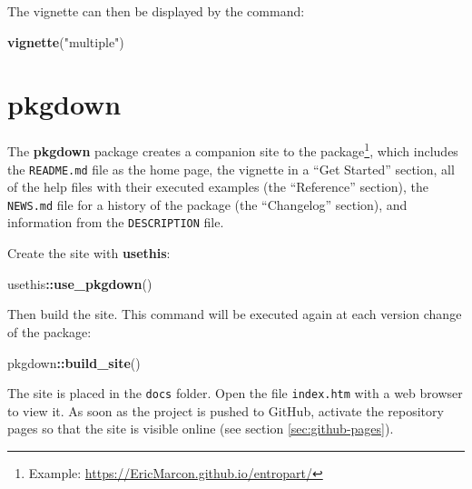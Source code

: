 \documentclass[
  12pt,
  american,
  a4paper,
  extrafontsizes,onecolumn,openright
  ]{memoir}
\newenvironment{Shaded}{\begin{snugshade}}{\end{snugshade}}
\newcommand{\FunctionTok}[1]{\textcolor[rgb]{0.13,0.29,0.53}{\textbf{#1}}}
\newcommand{\NormalTok}[1]{#1}
\newcommand{\SpecialCharTok}[1]{\textcolor[rgb]{0.81,0.36,0.00}{\textbf{#1}}}
\newcommand{\StringTok}[1]{\textcolor[rgb]{0.31,0.60,0.02}{#1}}
\begin{document}
\normalsize

The vignette can then be displayed by the command:

\scriptsize

\begin{Shaded}
\begin{Highlighting}[]
\FunctionTok{vignette}\NormalTok{(}\StringTok{"multiple"}\NormalTok{)}
\end{Highlighting}
\end{Shaded}

\normalsize

\section{pkgdown}\label{pkgdown}

The \textbf{pkgdown} package creates a companion site to the package\footnote{Example: \url{https://EricMarcon.github.io/entropart/}}, which includes the \texttt{README.md} file as the home page, the vignette in a \enquote{Get Started} section, all of the help files with their executed examples (the \enquote{Reference} section), the \texttt{NEWS.md} file for a history of the package (the \enquote{Changelog} section), and information from the \texttt{DESCRIPTION} file.

Create the site with \textbf{usethis}:

\scriptsize

\begin{Shaded}
\begin{Highlighting}[]
\NormalTok{usethis}\SpecialCharTok{::}\FunctionTok{use\_pkgdown}\NormalTok{()}
\end{Highlighting}
\end{Shaded}

\normalsize

Then build the site.
This command will be executed again at each version change of the package:

\scriptsize

\begin{Shaded}
\begin{Highlighting}[]
\NormalTok{pkgdown}\SpecialCharTok{::}\FunctionTok{build\_site}\NormalTok{()}
\end{Highlighting}
\end{Shaded}

\normalsize

The site is placed in the \texttt{docs} folder.
Open the file \texttt{index.htm} with a web browser to view it.
As soon as the project is pushed to GitHub, activate the repository pages so that the site is visible online (see section \ref{sec:github-pages}).
\end{document}
